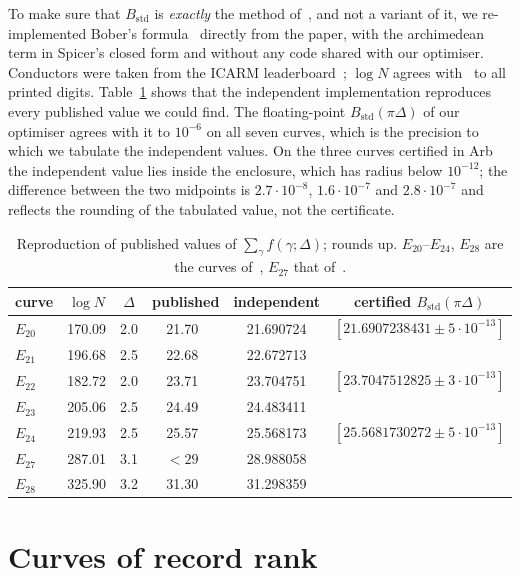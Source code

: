 \documentclass[11pt]{amsart}
\theoremstyle{remark}
\theoremstyle{definition}
\begin{document}
To make sure that $B_{\mathrm{std}}$ is \emph{exactly} the method of~\cite{Bober,KSW}, and not a variant of it, we re-implemented Bober's formula~\cite[eq.~(3)]{Bober} directly from the paper, with the archimedean term in Spicer's closed form and without any code shared with our optimiser. Conductors were taken from the ICARM leaderboard~\cite{ICARM}; $\log N$ agrees with~\cite[Table~1]{Bober} to all printed digits. Table~\ref{tab:valid} shows that the independent implementation reproduces every published value we could find. The floating-point $B_{\mathrm{std}}(\pi\Delta)$ of our optimiser agrees with it to $10^{-6}$ on all seven curves, which is the precision to which we tabulate the
independent values. On the three curves certified in Arb the independent value lies inside the enclosure,
which has radius below $10^{-12}$; the difference between the two midpoints is $2.7\cdot10^{-8}$,
$1.6\cdot10^{-7}$ and $2.8\cdot10^{-7}$ and reflects the rounding of the tabulated value, not the
certificate.

\begin{table}[h]
\centering\small
\begin{tabular}{lccccc}
\toprule
curve & $\log N$ & $\Delta$ & published & independent & certified $B_{\mathrm{std}}(\pi\Delta)$\\
\midrule
$E_{20}$ & 170.09 & 2.0 & 21.70~\cite{Bober} & 21.690724 & $[21.6907238431\pm5\cdot10^{-13}]$\\
$E_{21}$ & 196.68 & 2.5 & 22.68~\cite{Bober} & 22.672713 & \\
$E_{22}$ & 182.72 & 2.0 & 23.71~\cite{Bober} & 23.704751 & $[23.7047512825\pm3\cdot10^{-13}]$\\
$E_{23}$ & 205.06 & 2.5 & 24.49~\cite{Bober} & 24.483411 & \\
$E_{24}$ & 219.93 & 2.5 & 25.57~\cite{Bober} & 25.568173 & $[25.5681730272\pm5\cdot10^{-13}]$\\
$E_{27}$ & 287.01 & 3.1 & $<29$~\cite{KSW} & 28.988058 & \\
$E_{28}$ & 325.90 & 3.2 & 31.30~\cite{Bober} & 31.298359 & \\
\bottomrule
\end{tabular}
\caption{Reproduction of published values of $\sum_\gamma f(\gamma;\Delta)$; \cite{Bober} rounds up. $E_{20}$--$E_{24}$, $E_{28}$ are the curves of~\cite{Bober}, $E_{27}$ that of~\cite{KSW}.}
\label{tab:valid}
\end{table}

\section{Curves of record rank}\label{sec:records}
\end{document}
